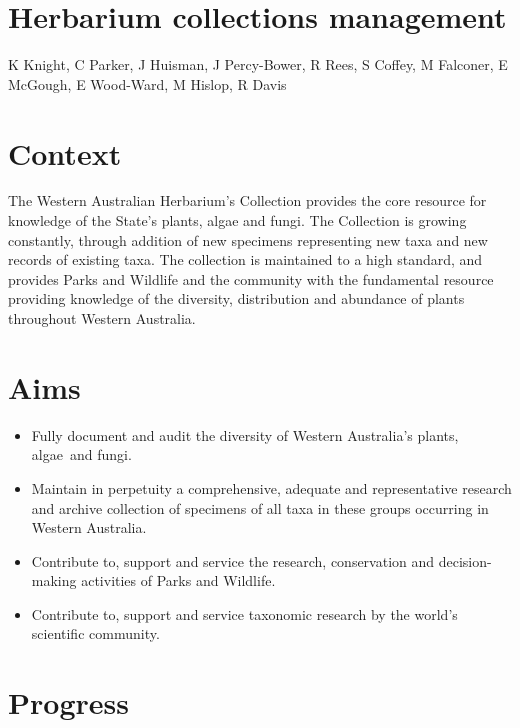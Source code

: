 \documentclass[version=last,
    paper=a4, %
    10pt, %
    usenames,
    dvipsnames,
    oneside, %
    headings=openany, %
    DIV=15 %
]{scrbook}
\begin{document}
\section*{Herbarium collections management
}

K Knight, C Parker, J Huisman, J Percy-Bower, R Rees, S Coffey, M
Falconer, E McGough, E Wood-Ward, M Hislop, R Davis



\section*{Context}

The Western Australian Herbarium's Collection provides the core resource
for knowledge of the State's plants, algae and fungi. The Collection is
growing constantly, through addition of new specimens representing new
taxa and new records of existing taxa. The collection is maintained to a
high standard, and provides Parks and Wildlife and the community with
the fundamental resource providing knowledge of the diversity,
distribution and abundance of plants throughout Western Australia.




\section*{Aims}

\begin{itemize}
\itemsep1pt\parskip0pt
\item
  Fully document and audit the diversity of Western Australia's plants,
  algae~and fungi.
\item
  Maintain in perpetuity a comprehensive, adequate and representative
  research and archive collection of specimens of all taxa in these
  groups occurring in Western Australia.
\item
  Contribute to, support and service the research, conservation and
  decision-making activities of Parks and Wildlife.
\item
  Contribute to, support and service taxonomic research by the world's
  scientific community.
\end{itemize}




\section*{Progress}
\end{document}
